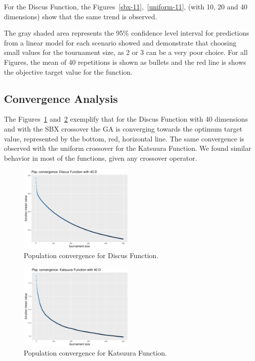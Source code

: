 For the Discus Function, the Figures~\ref{sbx-11},~\ref{uniform-11}, (with 10, 20 and 40 dimensions) show that the same trend is observed. 

The gray shaded area represents the 95\% confidence level interval for predictions from a linear model for each scenario showed and demonstrate that choosing small values for the tournament size, as 2 or 3 can be a very poor choice. For all Figures, the mean of 40 repetitions is shown as bullets and the red line is shows the objective target value for the function.


\subsection{Convergence Analysis}
The Figures~\ref{convegence-11} and~\ref{convergence-23} exemplify that for the Discus Function with 40 dimensions and with the SBX crossover the GA is converging towards the optimum target value, represented by the bottom, red, horizontal line. The same convergence is observed with the uniform crossover for the Katsuura Function. We found similar behavior in most of the functions, given any crossover operator.

\begin{figure}[t]
	\includegraphics[width=0.5\textwidth]{img/Uniform_convergence_40D_DiscusF.pdf}
	\caption{Population convergence for Discus Function.}
	\label{convegence-11}
\end{figure}


\begin{figure}[t]
	\includegraphics[width=0.5\textwidth]{img/Sbx_convergence_40D_katsuuraF.pdf}
	\caption{Population convergence for Katsuura Function.}
	\label{convergence-23}
\end{figure}


